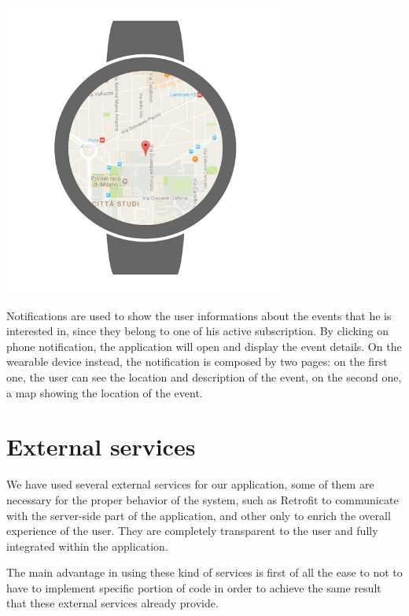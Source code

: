 \documentclass[a4paper]{scrreprt}
\begin{document}
\begin{minipage}{0.33\textwidth}
	\centering
	\includegraphics[width=0.7\textwidth]{imgs/notification_wear_map.png}
\end{minipage}
\par\bigskip
Notifications are used to show the user informations about the events that he is interested in, since they belong to one of his active subscription. By clicking on phone notification, the application will open and display the event details. On the wearable device instead, the notification is composed by two pages: on the first one, the user can see the location and description of the event, on the second one, a map showing the location of the event.

\chapter{External services}
We have used several external services for our application, some of them are necessary for the proper behavior of the system, such as Retrofit to communicate with the server-side part of the application, and other only to enrich the overall experience of the user. They are completely transparent to the user and fully integrated within the application.

The main advantage in using these kind of services is first of all the ease to not to have to implement specific portion of code in order to achieve the same result that these external services already provide.
\end{document}
